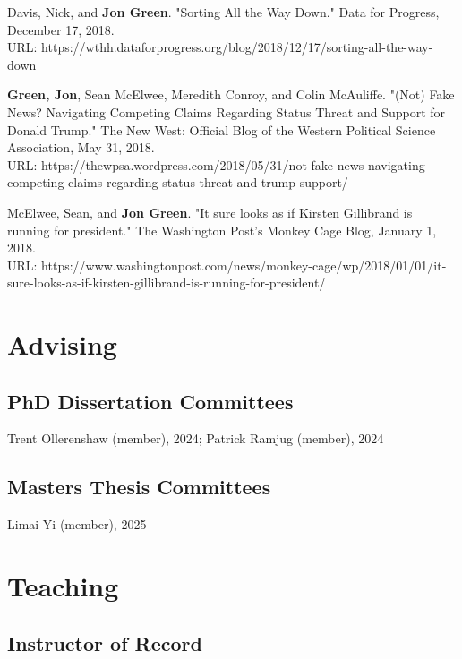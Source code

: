 \documentclass[letterpaper]{article}
\renewenvironment{itemize}{
  \begin{list}{}{
    \setlength{\leftmargin}{1.5em}
  }
}{
  \end{list}
}
\begin{document}
\begin{itemize}
\item Davis, Nick, and \textbf{Jon Green}. "Sorting All the Way Down." Data for Progress, December 17, 2018. \\
URL: https://wthh.dataforprogress.org/blog/2018/12/17/sorting-all-the-way-down

\item \textbf{Green, Jon}, Sean McElwee, Meredith Conroy, and Colin McAuliffe. "(Not) Fake News? Navigating Competing Claims Regarding Status Threat and Support for Donald Trump." The New West: Official Blog of the Western Political Science Association, May 31, 2018. \\
URL: https://thewpsa.wordpress.com/2018/05/31/not-fake-news-navigating-competing-claims-regarding-status-threat-and-trump-support/

\item McElwee, Sean, and \textbf{Jon Green}. "It sure looks as if Kirsten Gillibrand is running for president." The Washington Post's Monkey Cage Blog, January 1, 2018. \\ 
URL: https://www.washingtonpost.com/news/monkey-cage/wp/2018/01/01/it-sure-looks-as-if-kirsten-gillibrand-is-running-for-president/
\end{itemize}

\section*{Advising}

\subsection*{PhD Dissertation Committees}

Trent Ollerenshaw (member), 2024; Patrick Ramjug (member), 2024

\subsection*{Masters Thesis Committees}

Limai Yi (member), 2025

\section*{Teaching}

\subsection*{Instructor of Record}
\end{document}
